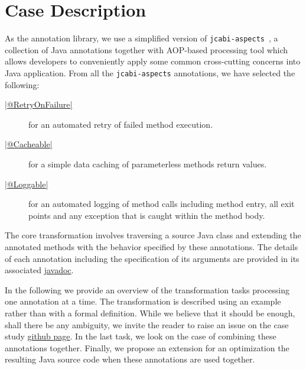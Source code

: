 
\section{Case Description}
\label{sec:Description}

As the annotation library, we use a simplified version of \texttt{jcabi-aspects}~\cite{jcabi}, a collection of Java annotations together with AOP-based processing tool which allows developers to conveniently apply some common cross-cutting concerns into Java application.
From all the \texttt{jcabi-aspects} annotations, we have selected the following:
%
\begin{description}
  \item[\href{https://github.com/fikovnik/ttc15-tranj-case/blob/master/src/ttc15-tranj/src/main/java/ttc15/tranj/annotation/RetryOnFailure.java}{\javainline|@RetryOnFailure|}] for an automated retry of failed method execution.
  \item[\href{https://github.com/fikovnik/ttc15-tranj-case/blob/master/src/ttc15-tranj/src/main/java/ttc15/tranj/annotation/Cacheable.java}{\javainline|@Cacheable|}] for a simple data caching of parameterless methods return values.
  \item[\href{https://github.com/fikovnik/ttc15-tranj-case/blob/master/src/ttc15-tranj/src/main/java/ttc15/tranj/annotation/Loggable.java}{\javainline|@Loggable|}] for an automated logging of method calls including method entry, all exit points and any exception that is caught within the method body.
\end{description}

The core transformation involves traversing a source Java class and extending the annotated methods with the behavior specified by these annotations.
The details of each annotation including the specification of its arguments are provided in its associated \href{https://github.com/fikovnik/ttc15-tranj-case/tree/master/src/ttc15-tranj/src/main/java/ttc15/tranj/annotation}{javadoc}.

In the following we provide an overview of the transformation tasks processing one annotation at a time.
The transformation is described using an example rather than with a formal definition.
While we believe that it should be enough, shall there be any ambiguity, we invite the reader to raise an issue on the case study \href{https://github.com/fikovnik/ttc15-tranj-case}{github page}.
In the last task, we look on the case of combining these annotations together.
Finally, we propose an extension for an optimization the resulting Java source code when these annotations are used together.

